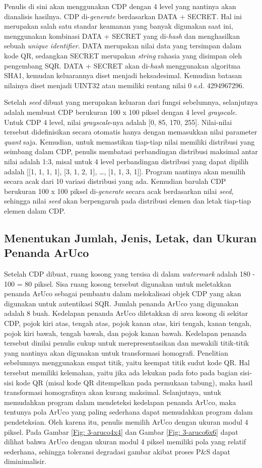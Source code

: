 Penulis di sini akan menggunakan CDP dengan 4 level yang nantinya akan dianalisis hasilnya. CDP di-\emph{generate} berdasarkan DATA + SECRET. Hal ini
merupakan salah satu standar keamanan yang banyak digunakan saat ini, menggunakan kombinasi DATA + SECRET yang di-\emph{hash} dan menghasilkan sebuah
\emph{unique identifier}. DATA merupakan nilai data yang tersimpan dalam kode QR, sedangkan SECRET merupakan \emph{string} rahasia yang disimpan oleh
pengembang SQR. DATA + SECRET akan di-\emph{hash} menggunakan algoritma SHA1, kemudan keluarannya diset menjadi heksadesimal. Kemudian batasan nilainya diset
menjadi UINT32 atau memiliki rentang nilai 0 s.d. 4294967296.

Setelah \emph{seed} dibuat yang merupakan keluaran dari fungsi sebelumnya, selanjutnya adalah membuat CDP berukuran 100 x 100 piksel dengan 4 level
\emph{grayscale}. Untuk CDP 4 level, nilai \emph{grayscale}-nya adalah [0, 85, 170, 255]. Nilai-nilai
tersebut didefinisikan secara otomatis hanya dengan memasukkan nilai parameter \emph{quant} saja. Kemudian, untuk memastikan tiap-tiap nilai memiliki
distribusi yang seimbang dalam CDP, penulis membatasi perbandingan distribusi maksimal antar nilai adalah 1:3, misal untuk 4 level perbandingan distribusi yang
dapat dipilih adalah [[1, 1, 1, 1], [3, 1, 2, 1], …, [1, 1, 3, 1]]. Program nantinya akan memilih secara acak dari 10 variasi distribusi yang ada. Kemudian
barulah CDP berukuran 100 x 100 piksel di-\emph{generate} secara acak berdasarkan nilai \emph{seed}, sehingga nilai \emph{seed} akan berpengaruh pada
distribusi elemen dan letak tiap-tiap elemen dalam CDP.

\subsection{Menentukan Jumlah, Jenis, Letak, dan Ukuran Penanda ArUco}
Setelah CDP dibuat, ruang kosong yang tersisa di dalam \emph{watermark} adalah 180 - 100 = 80 piksel. Sisa ruang kosong tersebut digunakan untuk meletakkan
penanda ArUco sebagai pembantu dalam melokalisasi objek CDP yang akan digunakan untuk autentikasi SQR. Jumlah penanda ArUco yang digunakan adalah 8 buah.
Kedelapan penanda ArUco diletakkan di area kosong di sekitar CDP, pojok kiri atas, tengah atas, pojok kanan atas, kiri tengah, kanan tengah, pojok kiri bawah,
tengah bawah, dan pojok kanan bawah. Kedelapan penanda tersebut dinilai penulis cukup untuk merepresentasikan dan mewakili titik-titik yang nantinya akan
digunakan untuk transformasi homografi. Penelitian sebelumnya menggunakan empat titik, yaitu keempat titik sudut kode QR. Hal tersebut memiliki kelemahan,
yaitu jika ada lekukan pada foto pada bagian sisi-sisi kode QR (misal kode QR ditempelkan pada permukaan tabung), maka hasil transformasi homografinya
akan kurang maksimal. Selanjutnya, untuk memudahkan program dalam mendeteksi kedelapan penanda ArUco, maka tentunya pola ArUco yang paling sederhana dapat
memudahkan program dalam pendeteksian. Oleh karena itu, penulis memilih ArUco dengan ukuran modul 4 piksel. Pada Gambar \ref{Fig: 3-aruco4x4} dan Gambar
\ref{Fig: 3-aruco6x6} dapat dilihat bahwa ArUco dengan ukuran modul 4 piksel memiliki pola yang relatif sederhana, sehingga toleransi degradasi gambar akibat
proses P\&S dapat diminimalisir.

